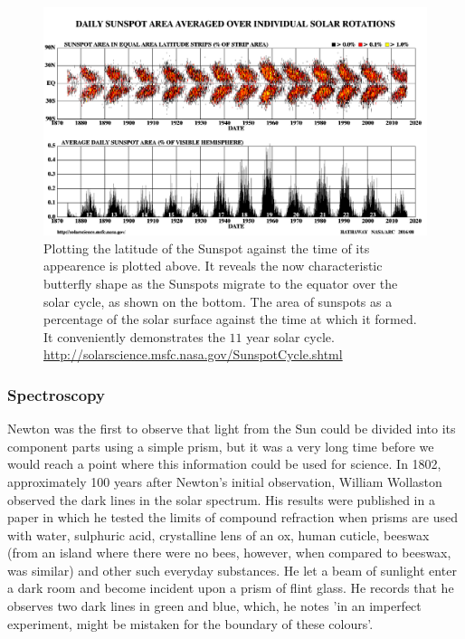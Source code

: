 \begin{figure}
	\centering
	\includegraphics[width=\linewidth]{Chapter1/Figs/bfly}
	\caption{Plotting the latitude of the Sunspot against the time of its appearence is plotted above. It reveals the now characteristic butterfly shape as the Sunspots migrate to the equator over the solar cycle, as shown on the bottom. The area of sunspots as a percentage of the solar surface against the time at which it formed. It conveniently demonstrates the $11$ year solar cycle. 
	\url{http://solarscience.msfc.nasa.gov/SunspotCycle.shtml}}
	\label{fig:sunspot_count}
\end{figure}

\subsubsection{Spectroscopy}

Newton was the first to observe that light from the Sun could be divided into its component parts using a simple prism, but it was a very long time before we would reach a point where this information could be used for science.
In 1802, approximately 100 years after Newton's initial observation, William Wollaston observed the dark lines in the solar spectrum.
His results were published in a paper in which he tested the limits of compound refraction when prisms are used with water, sulphuric acid, crystalline lens of an ox, human cuticle, beeswax (from an island where there were no bees, however, when compared to beeswax, was similar) and other such everyday substances.
He let a beam of sunlight enter a dark room and become incident upon a prism of flint glass.
He records that he observes two dark lines in green and blue, which, he notes 'in an imperfect experiment, might be mistaken for the boundary of these colours'.

